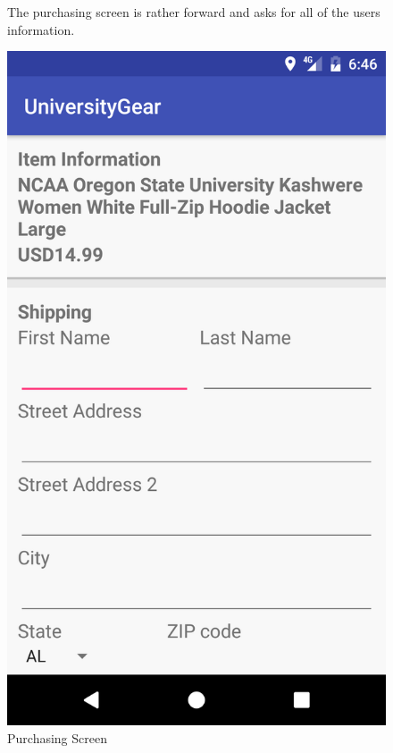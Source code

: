 \documentclass[journal,compsoc, 10pt, draftclsnofoot, onecolumn]{IEEEtran}
\begin{document}
\begin{figure}[!h]
The purchasing screen is rather forward and asks for all of the users information.
\centering
\caption{Purchasing Screen}
\includegraphics[scale=.13]{purchase}
\end{figure}
\FloatBarrier
\end{document}
